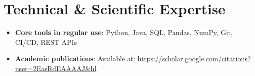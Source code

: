 \documentclass[letterpaper,11pt]{article}
\begin{document}
\section{Technical \& Scientific Expertise}
\begin{itemize}[leftmargin=*, itemsep=-4pt, topsep=0pt, label={\raisebox{0.4ex}{\tiny\textbullet}}]
  \item \textbf{Core tools in regular use}: Python, Java, SQL, Pandas, NumPy, Git, CI/CD, REST APIs  
  \item \textbf{Academic publications}: Available at: \url{https://scholar.google.com/citations?user=2EasRdEAAAAJ&hl}
\end{itemize}
\end{document}

